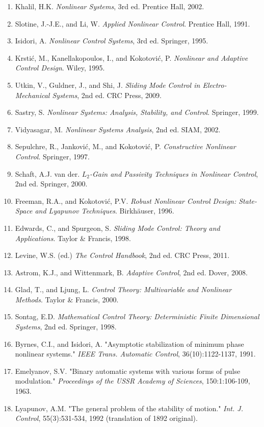 \documentclass[a4paper, 11pt]{article}
\begin{document}
\begin{enumerate}
\item Khalil, H.K. \textit{Nonlinear Systems}, 3rd ed. Prentice Hall, 2002.
\item Slotine, J.-J.E., and Li, W. \textit{Applied Nonlinear Control}. Prentice Hall, 1991.
\item Isidori, A. \textit{Nonlinear Control Systems}, 3rd ed. Springer, 1995.
\item Krstić, M., Kanellakopoulos, I., and Kokotović, P. \textit{Nonlinear and Adaptive Control Design}. Wiley, 1995.
\item Utkin, V., Guldner, J., and Shi, J. \textit{Sliding Mode Control in Electro-Mechanical Systems}, 2nd ed. CRC Press, 2009.
\item Sastry, S. \textit{Nonlinear Systems: Analysis, Stability, and Control}. Springer, 1999.
\item Vidyasagar, M. \textit{Nonlinear Systems Analysis}, 2nd ed. SIAM, 2002.
\item Sepulchre, R., Janković, M., and Kokotović, P. \textit{Constructive Nonlinear Control}. Springer, 1997.
\item Schaft, A.J. van der. \textit{$L_2$-Gain and Passivity Techniques in Nonlinear Control}, 2nd ed. Springer, 2000.
\item Freeman, R.A., and Kokotović, P.V. \textit{Robust Nonlinear Control Design: State-Space and Lyapunov Techniques}. Birkhäuser, 1996.
\item Edwards, C., and Spurgeon, S. \textit{Sliding Mode Control: Theory and Applications}. Taylor \& Francis, 1998.
\item Levine, W.S. (ed.) \textit{The Control Handbook}, 2nd ed. CRC Press, 2011.
\item Astrom, K.J., and Wittenmark, B. \textit{Adaptive Control}, 2nd ed. Dover, 2008.
\item Glad, T., and Ljung, L. \textit{Control Theory: Multivariable and Nonlinear Methods}. Taylor \& Francis, 2000.
\item Sontag, E.D. \textit{Mathematical Control Theory: Deterministic Finite Dimensional Systems}, 2nd ed. Springer, 1998.
\item Byrnes, C.I., and Isidori, A. "Asymptotic stabilization of minimum phase nonlinear systems." \textit{IEEE Trans. Automatic Control}, 36(10):1122-1137, 1991.
\item Emelyanov, S.V. "Binary automatic systems with various forms of pulse modulation." \textit{Proceedings of the USSR Academy of Sciences}, 150:1:106-109, 1963.
\item Lyapunov, A.M. "The general problem of the stability of motion." \textit{Int. J. Control}, 55(3):531-534, 1992 (translation of 1892 original).
\end{enumerate}
\end{document}
